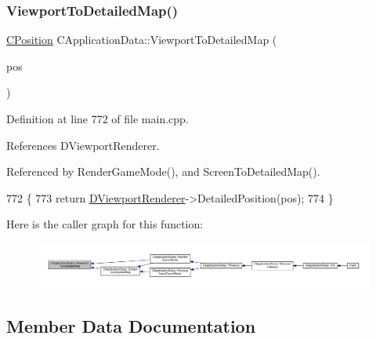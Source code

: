 \subsubsection{\texorpdfstring{Viewport\+To\+Detailed\+Map()}{ViewportToDetailedMap()}}
{\footnotesize\ttfamily \hyperlink{classCPosition}{C\+Position} C\+Application\+Data\+::\+Viewport\+To\+Detailed\+Map (\begin{DoxyParamCaption}\item[{const \hyperlink{classCPosition}{C\+Position} \&}]{pos }\end{DoxyParamCaption})\hspace{0.3cm}{\ttfamily [protected]}}



Definition at line 772 of file main.\+cpp.



References D\+Viewport\+Renderer.



Referenced by Render\+Game\+Mode(), and Screen\+To\+Detailed\+Map().


\begin{DoxyCode}
772                                                                      \{
773     \textcolor{keywordflow}{return} \hyperlink{classCApplicationData_a31da050ebca942272344c8b736d72848}{DViewportRenderer}->DetailedPosition(pos);
774 \}
\end{DoxyCode}
Here is the caller graph for this function\+:\nopagebreak
\begin{figure}[H]
\begin{center}
\leavevmode
\includegraphics[width=350pt]{classCApplicationData_a2871f1b0855d14ed77db1abd83585d64_icgraph}
\end{center}
\end{figure}


\subsection{Member Data Documentation}
\hypertarget{classCApplicationData_a839f21d18d88deb29fe1196a8efc6096}{}\label{classCApplicationData_a839f21d18d88deb29fe1196a8efc6096} 
